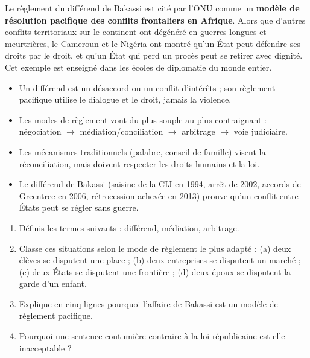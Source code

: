 \documentclass[11pt]{article}
\newcommand{\cle}[1]{{\popxbold\color{popdark}#1}}
\begin{document}
\begin{savaistu}
Le règlement du différend de Bakassi est cité par l'\cle{ONU} comme un \textbf{modèle de résolution pacifique des conflits frontaliers en Afrique}. Alors que d'autres conflits territoriaux sur le continent ont dégénéré en guerres longues et meurtrières, le Cameroun et le Nigéria ont montré qu'un État peut défendre ses droits par le droit, et qu'un État qui perd un procès peut se retirer avec dignité. Cet exemple est enseigné dans les écoles de diplomatie du monde entier.
\end{savaistu}

\begin{aretenir}
\begin{itemize}
\item Un \cle{différend} est un désaccord ou un conflit d'intérêts ; son \cle{règlement pacifique} utilise le dialogue et le droit, jamais la violence.
\item Les modes de règlement vont du plus souple au plus contraignant : \cle{négociation} $\rightarrow$ \cle{médiation}/conciliation $\rightarrow$ \cle{arbitrage} $\rightarrow$ \cle{voie judiciaire}.
\item Les mécanismes traditionnels (palabre, conseil de famille) visent la réconciliation, mais doivent respecter les droits humains et la loi.
\item Le différend de \cle{Bakassi} (saisine de la CIJ en 1994, arrêt de 2002, accords de Greentree en 2006, rétrocession achevée en 2013) prouve qu'un conflit entre États peut se régler sans guerre.
\end{itemize}
\end{aretenir}

\begin{exercice}
\begin{enumerate}
\item Définis les termes suivants : différend, médiation, arbitrage.
\item Classe ces situations selon le mode de règlement le plus adapté : (a) deux élèves se disputent une place ; (b) deux entreprises se disputent un marché ; (c) deux États se disputent une frontière ; (d) deux époux se disputent la garde d'un enfant.
\item Explique en cinq lignes pourquoi l'affaire de Bakassi est un modèle de règlement pacifique.
\item Pourquoi une sentence coutumière contraire à la loi républicaine est-elle inacceptable ?
\end{enumerate}
\end{exercice}
\end{document}
